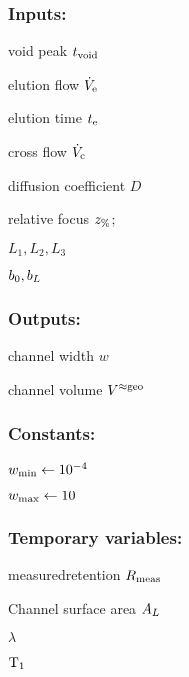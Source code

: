 \subsubsection*{Inputs:}
\begin{multicols}{3}
  \begin{packed_item}
    \item void peak $t_\text{void}$
    \item elution flow $\dot{V}_\text{e}$
    \item elution time $t_\text{e}$
    \item cross flow $\dot{V}_\text{c}$
    \item \small diffusion coefficient \normalsize $D$
    \item relative focus $z_\text{\%}$;
    \item $L_1, L_2, L_3$
    \item $b_0, b_L$
  \end{packed_item}
\end{multicols}

\subsubsection*{Outputs:}
\begin{multicols}{3}
  \begin{packed_item}
    \item channel width $w$
    \item channel volume $V^{\approx\text{geo}}$
  \end{packed_item}
\end{multicols}

\subsubsection*{Constants:}
\begin{multicols}{3}
  \begin{packed_item}
    \item $w_\text{min} \leftarrow 10^{-4}$
    \item  $w_\text{max} \leftarrow 10$
  \end{packed_item}
\end{multicols}

\subsubsection*{Temporary variables:}
\begin{multicols}{3}
  \begin{packed_item}
    \item measured\enspace retention $R_\text{meas}$
    \item Channel surface area $A_L$
    \item $\lambda$
    \item $\text{T}_{1}$
  \end{packed_item}
\end{multicols}

